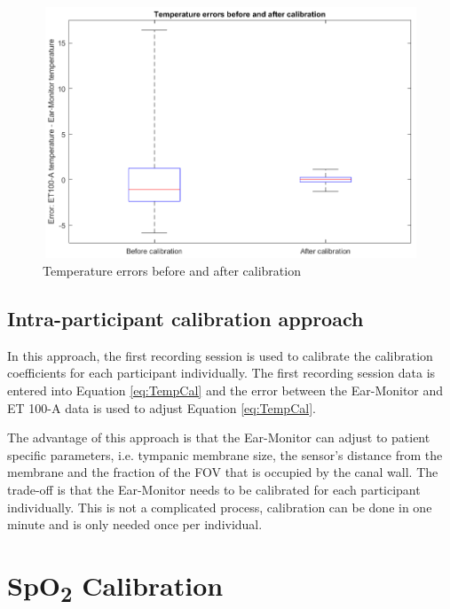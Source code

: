 \begin{figure}[H]
   \centering
   \includegraphics[width=12cm,height=7.5cm]{figs/BeforeAfterCalibrationBoxplot.png}
   \caption{Temperature errors before and after calibration}
   \label{fig:BeforeAfterCalibrationBoxplot}
\end{figure}


\subsection{Intra-participant calibration approach}
In this approach, the first recording session is used to calibrate the calibration coefficients for each participant individually. The first recording session data is entered into Equation \ref{eq:TempCal} and the error between the Ear-Monitor and ET 100-A data is used to adjust Equation \ref{eq:TempCal}.

\medskip

The advantage of this approach is that the Ear-Monitor can adjust to patient specific parameters, i.e. tympanic membrane size, the sensor's distance from the membrane and the fraction of the FOV that is occupied by the canal wall. The trade-off is that the Ear-Monitor needs to be calibrated for each participant individually. This is not a complicated process, calibration can be done in one minute and is only needed once per individual. 

\section{SpO\textsubscript{2} Calibration}











